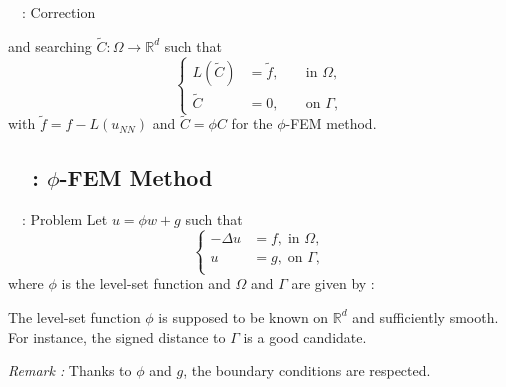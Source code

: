 \begin{frame}{\appendixname~\theappendixframenumber~: Correction}
	\vspace{-8pt}
	\begin{minipage}{\linewidth}
		and searching $\tilde{C}: \Omega \rightarrow \mathbb{R}^d$ such that
		\begin{equation*}
			\left\{\begin{aligned}
				L(\tilde{C})&=\tilde{f}, \; &&\text{in } \Omega, \\
				\tilde{C}&=0, \; &&\text{on } \Gamma,
			\end{aligned}\right. %
		\end{equation*}
		with $\tilde{f}=f-L(u_{NN})$ and $\tilde{C}=\phi C$ for the $\phi$-FEM method.
	\end{minipage}
\end{frame}
\addtocounter{appendixframenumber}{1}

\subsection{\appendixname~\theappendixframenumber~: $\phi$-FEM Method}

\begin{frame}{\appendixname~\theappendixframenumber~: Problem}
	Let $u=\phi w+g$ such that
	$$\left\{\begin{aligned}
		-\Delta u &= f, \; \text{in } \Omega, \\
		u&=g, \; \text{on } \Gamma, \\
	\end{aligned}\right.$$
	where $\phi$ is the level-set function and $\Omega$ and $\Gamma$ are given by :
	\begin{center}
	\end{center}
	The level-set function $\phi$ is supposed to be known on $\mathbb{R}^d$ and sufficiently smooth. \\
	For instance, the signed distance to $\Gamma$ is a good candidate.
	
	\vspace{5pt}
	
	\footnotesize
	\textit{Remark :} Thanks to $\phi$ and $g$, the boundary conditions are respected.
\end{frame}

